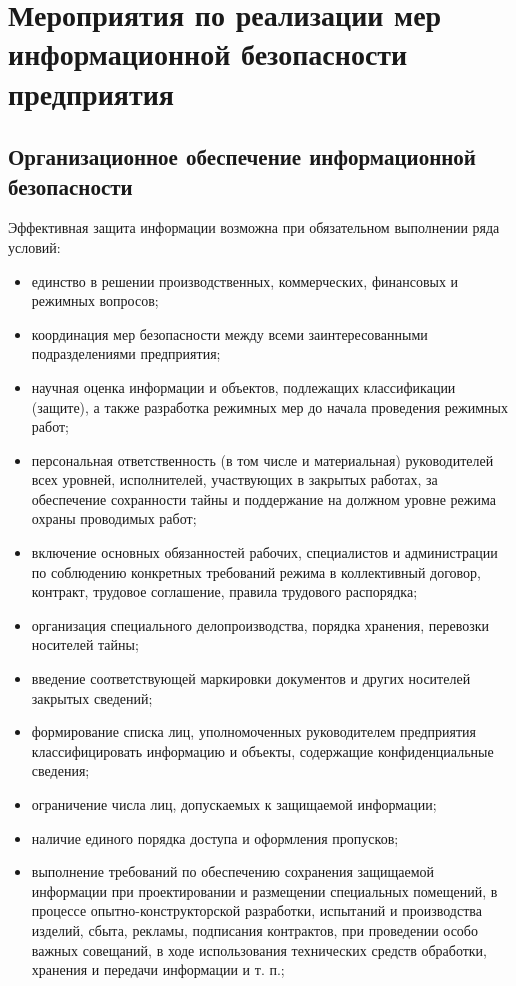 
\section{Мероприятия по реализации мер информационной безопасности предприятия}
\label{sec:measures}


\subsection{Организационное обеспечение информационной безопасности}
\label{subsec:measures:organisational}

Эффективная защита информации возможна при обязательном выполнении ряда условий:
\begin{itemize}
	\item единство в решении производственных, коммерческих,
финансовых и режимных вопросов;
	\item координация мер безопасности между всеми заинтересованными подразделениями предприятия;
	\item научная оценка информации и объектов, подлежащих классификации (защите), а также разработка режимных мер до начала проведения режимных работ;
	\item персональная ответственность (в том числе и материальная) руководителей всех уровней, исполнителей, участвующих в закрытых работах, за обеспечение сохранности тайны и поддержание на должном уровне режима охраны проводимых работ;
	\item включение основных обязанностей рабочих, специалистов и администрации по соблюдению конкретных требований режима в коллективный договор, контракт, трудовое соглашение, правила трудового распорядка;
	\item организация специального делопроизводства, порядка хранения, перевозки носителей тайны;
	\item введение соответствующей маркировки документов и других носителей закрытых сведений;
	\item формирование списка лиц, уполномоченных руководителем предприятия классифицировать информацию и объекты, содержащие конфиденциальные сведения;
	\item ограничение числа лиц, допускаемых к защищаемой информации;
	\item наличие единого порядка доступа и оформления пропусков;
	\item выполнение требований по обеспечению сохранения защищаемой информации при проектировании и размещении специальных помещений, в процессе опытно-конструкторской разработки, испытаний и производства изделий, сбыта, рекламы, подписания контрактов, при проведении особо важных совещаний, в ходе использования технических средств обработки, хранения и передачи информации и т. п.;

\end{itemize}
